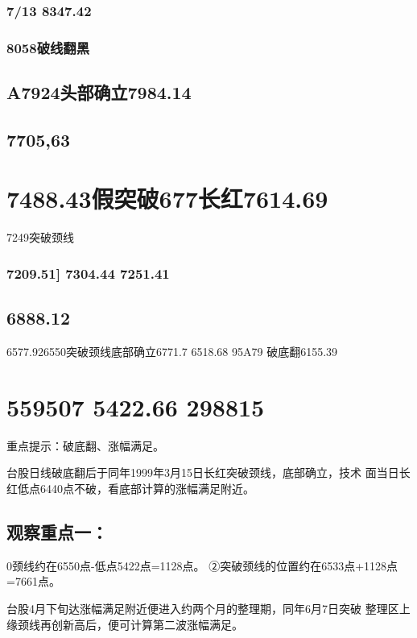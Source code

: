 \documentclass{article}
\begin{document}
\subsubsection{7/13 8347.42}

\subsubsection{8058破线翻黑}

\subsection{A7924头部确立7984.14}

\subsection{7705,63}

\section{7488.43假突破677长红7614.69}

7249突破颈线

\subsubsection{7209.51] 7304.44 7251.41}

\subsection{6888.12}

6577.926550突破颈线底部确立6771.7 6518.68 95A79 破底翻6155.39

\section{559507 5422.66 298815}

重点提示：破底翻、涨幅满足。

台股日线破底翻后于同年1999年3月15日长红突破颈线，底部确立，技术 面当日长红低点6440点不破，看底部计算的涨幅满足附近。

\subsection{观察重点一：}

0颈线约在6550点-低点5422点=1128点。 ②突破颈线的位置约在6533点+1128点=7661点。

台股4月下旬达涨幅满足附近便进入约两个月的整理期，同年6月7日突破 整理区上缘颈线再创新高后，便可计算第二波涨幅满足。
\end{document}
